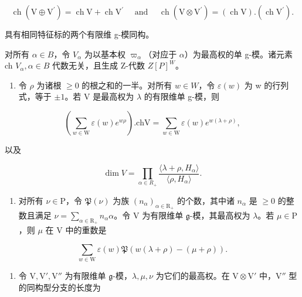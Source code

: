 \[
\operatorname{ch} \left(\mathrm{V} \oplus \mathrm{V} ^ {\prime}\right) = \operatorname{ch} \mathrm{V} + \operatorname{ch} \mathrm{V} ^ {\prime} \quad \text { and } \quad \operatorname{ch} \left(\mathrm{V} \otimes \mathrm{V} ^ {\prime}\right) = (\operatorname{ch} \mathrm{V}). (\operatorname{ch} \mathrm{V} ^ {\prime}).
\]

具有相同特征标的两个有限维 g-模同构。

对所有 \(\alpha\in B\)，令 \(V_{\alpha}\) 为以基本权 \(\varpi_{\alpha}\)（对应于 \(\alpha\)）为最高权的单 g-模。诸元素 ch \(V_{\alpha},\alpha\in B\) 代数无关，且生成 Z-代数 \(Z[P]^{W}\)。

\begin{enumerate}
\def\labelenumi{\arabic{enumi})}
\setcounter{enumi}{25}
\tightlist
\item
  令 \(\rho\) 为诸根 \(\geq 0\) 的根之和的一半。对所有 \(w \in W\)，令 \(\varepsilon(w)\) 为 w 的行列式，等于 \(\pm 1\)。若 V 是最高权为 \(\lambda\) 的有限维单 g-模，则
\end{enumerate}

\[
\left(\sum_ {w \in \mathrm{W}} \varepsilon (w) e ^ {w \rho}\right). \mathrm{chV} = \sum_ {w \in \mathrm{W}} \varepsilon (w) e ^ {w (\lambda + \rho)},
\]

以及

\[
\dim V = \prod_ {\alpha \in R _ {+}} \frac {\langle \lambda + \rho , H _ {\alpha} \rangle}{\langle \rho , H _ {\alpha} \rangle}.
\]

\begin{enumerate}
\def\labelenumi{\arabic{enumi})}
\setcounter{enumi}{26}
\tightlist
\item
  对所有 \(\nu \in \mathrm{P}\)，令 \(\mathfrak{P}(\nu)\) 为族 \((n_{\alpha})_{\alpha \in \mathrm{R}_{+}}\) 的个数，其中诸 \(n_{\alpha}\) 是 \(\geq 0\) 的整数且满足 \(\nu = \sum_{\alpha \in \mathrm{R}_{+}} n_{\alpha} \alpha\)。令 \(\mathrm{V}\) 为有限维单 \(\mathfrak{g}\)-模，其最高权为 \(\lambda\)。若 \(\mu \in \mathrm{P}\)，则 \(\mu\) 在 \(\mathrm{V}\) 中的重数是
\end{enumerate}

\[
\sum_ {w \in \mathrm{W}} \varepsilon (w) \mathfrak {P} (w (\lambda + \rho) - (\mu + \rho)).
\]

\begin{enumerate}
\def\labelenumi{\arabic{enumi})}
\setcounter{enumi}{27}
\tightlist
\item
  令 \(\mathrm{V}, \mathrm{V}', \mathrm{V}''\) 为有限维单 \(\mathfrak{g}\)-模，\(\lambda, \mu, \nu\) 为它们的最高权。在 \(\mathrm{V} \otimes \mathrm{V}'\) 中，\(\mathrm{V}''\) 型的同构型分支的长度为
\end{enumerate}


